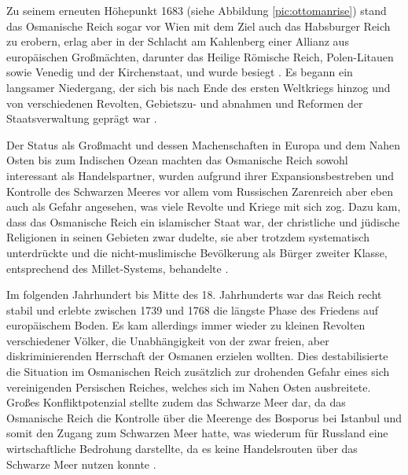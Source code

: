 \documentclass[preprint]{geomorphica} %
\begin{document}
Zu seinem erneuten Höhepunkt 1683 (siehe Abbildung \ref{pic:ottomanrise}) stand das Osmanische Reich sogar vor Wien mit dem Ziel auch das Habsburger Reich zu erobern, erlag aber in der Schlacht am Kahlenberg einer Allianz aus europäischen Großmächten, darunter das Heilige Römische Reich, Polen-Litauen sowie Venedig und der Kirchenstaat, und wurde besiegt \cite{Kinross1979, Kafadar1995, Jorga1990}.
Es begann ein langsamer Niedergang, der sich bis nach Ende des ersten Weltkriegs hinzog und von verschiedenen Revolten, Gebietszu- und abnahmen und Reformen der Staatsverwaltung geprägt war \cite{Finkel2007, Anderson1966}.

Der Status als Großmacht und dessen Machenschaften in Europa und dem Nahen Osten bis zum Indischen Ozean machten das Osmanische Reich sowohl interessant als Handelspartner, wurden aufgrund ihrer Expansionsbestreben und Kontrolle des Schwarzen Meeres vor allem vom Russischen Zarenreich aber eben auch als Gefahr angesehen, was viele Revolte und Kriege mit sich zog.
Dazu kam, dass das Osmanische Reich ein islamischer Staat war, der christliche und jüdische Religionen in seinen Gebieten zwar dudelte, sie aber trotzdem systematisch unterdrückte und die nicht-muslimische Bevölkerung als Bürger zweiter Klasse, entsprechend des Millet-Systems, behandelte \cite{Jorga1990, Sugar1977}.

Im folgenden Jahrhundert bis Mitte des 18. Jahrhunderts war das Reich recht stabil und erlebte zwischen 1739 und 1768 die längste Phase des Friedens auf europäischem Boden.
Es kam allerdings immer wieder zu kleinen Revolten verschiedener Völker, die Unabhängigkeit von der zwar freien, aber diskriminierenden Herrschaft der Osmanen erzielen wollten.
Dies destabilisierte die Situation im Osmanischen Reich zusätzlich zur drohenden Gefahr eines sich vereinigenden Persischen Reiches, welches sich im Nahen Osten ausbreitete.
Großes Konfliktpotenzial stellte zudem das Schwarze Meer dar, da das Osmanische Reich die Kontrolle über die Meerenge des Bosporus bei Istanbul und somit den Zugang zum Schwarzen Meer hatte, was wiederum für Russland eine wirtschaftliche Bedrohung darstellte, da es keine Handelsrouten über das Schwarze Meer nutzen konnte \cite{Finkel2007, Kinross1979, Jorga1990, Anderson1966}.
\end{document}
